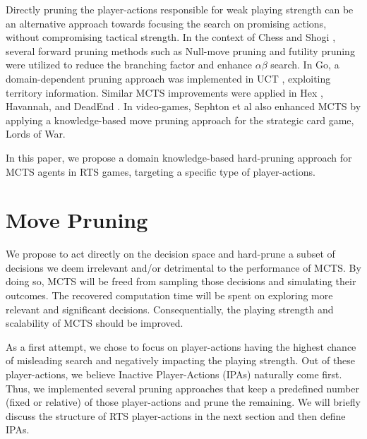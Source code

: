 \documentclass[conference]{IEEEtran}
\begin{document}
Directly pruning the player-actions responsible for weak playing strength can be an alternative approach towards focusing the search on promising actions, without compromising tactical strength. In the context of Chess \cite{heinz_adaptive_1999} and Shogi \cite{hoki_efficiency_2012}, several forward pruning methods such as Null-move pruning and futility pruning were utilized to reduce the branching factor and enhance $\alpha\beta$ search. In Go, a domain-dependent pruning approach was implemented in UCT \cite{huang_pruning_2010-1}, exploiting territory information. Similar MCTS improvements were applied in Hex \cite{arneson_monte_2010}, Havannah, \cite{dugueperoux_pruning_2016} and DeadEnd \cite{he_game_2008-1}. In video-games, Sephton et al \cite{sephton_heuristic_2014} also enhanced MCTS by applying a knowledge-based move pruning approach for the strategic card game, Lords of War.

In this paper, we propose a domain knowledge-based hard-pruning approach for MCTS agents in RTS games, targeting a specific type of player-actions.



\section{Move Pruning}
\label{sec:proposed_method}

We propose to act directly on the decision space and hard-prune a subset of decisions we deem irrelevant and/or detrimental to the performance of MCTS. By doing so, MCTS will be freed from sampling those decisions and simulating their outcomes. The recovered computation time will be spent on exploring more relevant and significant decisions. Consequentially, the playing strength and scalability of MCTS should be improved.

As a first attempt, we chose to focus on player-actions having the highest chance of misleading search and negatively impacting the playing strength. Out of these player-actions, we believe Inactive Player-Actions (IPAs) naturally come first. Thus, we implemented several pruning approaches that keep a predefined number (fixed or relative) of those player-actions and prune the remaining. We will briefly discuss the structure of RTS player-actions in the next section and then define IPAs.

\end{document}
